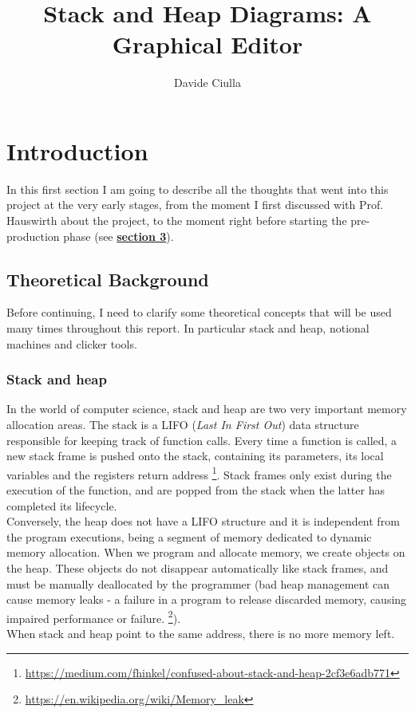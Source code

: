 \documentclass[]{usiinfbachelorproject}
\author{Davide Ciulla}
\title{Stack and Heap Diagrams: A Graphical Editor}
\begin{document}
\maketitle


\tableofcontents
\newpage


\section{Introduction} \label{introduction}

In this first section I am going to describe all the thoughts that went into this project at the very early stages, from the moment I first discussed with Prof. Hauswirth about the project, to the moment right before starting the pre-production phase (see \hyperref[requirements+analysis]{\textbf{section 3}}).

\subsection{Theoretical Background}

Before continuing, I need to clarify some theoretical concepts that will be used many times throughout this report. In particular stack and heap, notional machines and clicker tools.

\subsubsection{Stack and heap}
In the world of computer science, stack and heap are two very important memory allocation areas. The stack is a LIFO (\emph{Last In First Out}) data structure responsible for keeping track of function calls. Every time a function is called, a new stack frame is pushed onto the stack, containing its parameters, its local variables
 and the registers return address \footnote{\url{https://medium.com/fhinkel/confused-about-stack-and-heap-2cf3e6adb771}}. Stack frames only exist during the execution of the function, and are popped from the stack when the latter has completed its lifecycle.\\
 Conversely, the heap does not have a LIFO structure and it is independent from the program executions, being a segment of memory dedicated to dynamic memory allocation. When we program and allocate memory, we create objects on the heap. These objects do not disappear automatically like stack frames, and must be manually deallocated by the programmer (bad heap management can cause memory leaks - a failure in a program to release discarded memory, causing impaired performance or failure. \footnote {\url{https://en.wikipedia.org/wiki/Memory_leak}}).\\
 When stack and heap point to the same address, there is no more memory left.
 
\end{document}
